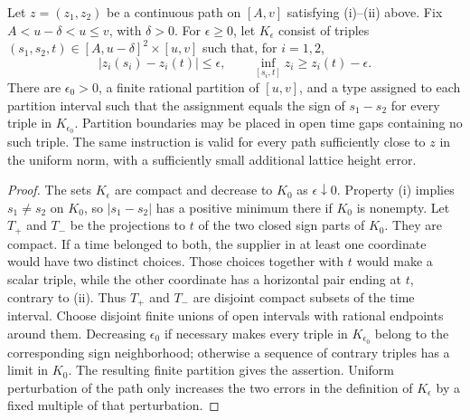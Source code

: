 \begin{lemma}\label{loc:finite-instructions}
Let $z=(z_1,z_2)$ be a continuous path on $[A,v]$ satisfying (i)--(ii)
above.  Fix $A<u-\delta<u\le v$, with $\delta>0$.  For $\epsilon\ge0$,
let $K_\epsilon$ consist of triples
$(s_1,s_2,t)\in[A,u-\delta]^2\times[u,v]$ such that, for $i=1,2$,
\[
 |z_i(s_i)-z_i(t)|\le\epsilon,
 \qquad
 \inf_{[s_i,t]}z_i\ge z_i(t)-\epsilon.
\]
There are $\epsilon_0>0$, a finite rational partition of $[u,v]$, and a
type assigned to each partition interval such that the assignment equals
the sign of $s_1-s_2$ for every triple in $K_{\epsilon_0}$.  Partition
boundaries may be placed in open time gaps containing no such triple.
The same instruction is valid for every path sufficiently close to $z$
in the uniform norm, with a sufficiently small additional lattice height
error.
\end{lemma}
\begin{proof}
The sets $K_\epsilon$ are compact and decrease to $K_0$ as
$\epsilon\downarrow0$.  Property (i) implies $s_1\ne s_2$ on $K_0$,
so $|s_1-s_2|$ has a positive minimum there if $K_0$ is nonempty.
Let $T_+$ and $T_-$ be the projections to $t$ of the two closed sign
parts of $K_0$.  They are compact.  If a time belonged to both, the
supplier in at least one coordinate would have two distinct choices.
Those choices together with $t$ would make a scalar triple, while the
other coordinate has a horizontal pair ending at $t$, contrary to (ii).
Thus $T_+$ and $T_-$ are disjoint compact subsets of the time interval.
Choose disjoint finite unions of open intervals with rational endpoints
around them.  Decreasing $\epsilon_0$ if necessary makes every triple
in $K_{\epsilon_0}$ belong to the corresponding sign neighborhood;
otherwise a sequence of contrary triples has a limit in $K_0$.
The resulting finite partition gives the assertion.  Uniform perturbation
of the path only increases the two errors in the definition of
$K_\epsilon$ by a fixed multiple of that perturbation.
\end{proof}


